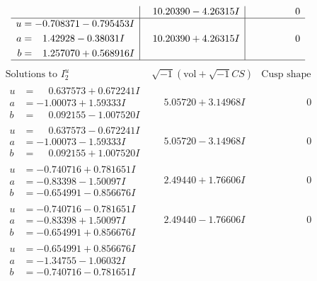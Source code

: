 \documentclass[1p]{elsarticle_modified}
\theoremstyle{definition}
\newcommand{\I}{\sqrt{-1}}
\begin{document}
$$\begin{array}{c|c|c}
 & \phantom{-}10.20390 - 4.26315 I & \phantom{-0.000000 } 0 \\ \hline\begin{aligned}
u &= -0.708371 - 0.795453 I \\
a &= \phantom{-}1.42928 - 0.38031 I \\
b &= \phantom{-}1.257070 + 0.568916 I\end{aligned}
 & \phantom{-}10.20390 + 4.26315 I & \phantom{-0.000000 } 0\\
 \hline 
 \end{array}$$\newpage$$\begin{array}{c|c|c}  
\text{Solutions to }I^u_{2}& \I (\text{vol} + \sqrt{-1}CS) & \text{Cusp shape}\\
 \hline 
\begin{aligned}
u &= \phantom{-}0.637573 + 0.672241 I \\
a &= -1.00073 + 1.59333 I \\
b &= \phantom{-}0.092155 - 1.007520 I\end{aligned}
 & \phantom{-}5.05720 + 3.14968 I & \phantom{-0.000000 } 0 \\ \hline\begin{aligned}
u &= \phantom{-}0.637573 - 0.672241 I \\
a &= -1.00073 - 1.59333 I \\
b &= \phantom{-}0.092155 + 1.007520 I\end{aligned}
 & \phantom{-}5.05720 - 3.14968 I & \phantom{-0.000000 } 0 \\ \hline\begin{aligned}
u &= -0.740716 + 0.781651 I \\
a &= -0.83398 - 1.50097 I \\
b &= -0.654991 - 0.856676 I\end{aligned}
 & \phantom{-}2.49440 + 1.76606 I & \phantom{-0.000000 } 0 \\ \hline\begin{aligned}
u &= -0.740716 - 0.781651 I \\
a &= -0.83398 + 1.50097 I \\
b &= -0.654991 + 0.856676 I\end{aligned}
 & \phantom{-}2.49440 - 1.76606 I & \phantom{-0.000000 } 0 \\ \hline\begin{aligned}
u &= -0.654991 + 0.856676 I \\
a &= -1.34755 - 1.06032 I \\
b &= -0.740716 - 0.781651 I\end{aligned}

\end{array}$$
\end{document}
